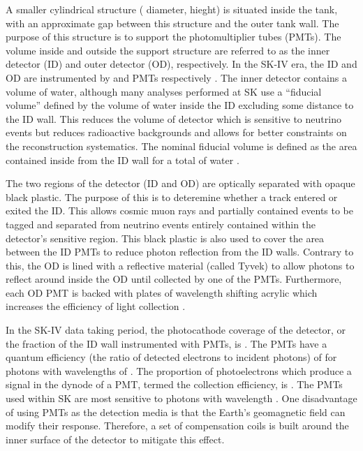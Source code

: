 A smaller cylindrical structure ( diameter,  hieght) is situated inside the tank, with an approximate  gap between this structure and the outer tank wall. The purpose of this structure is to support the photomultiplier tubes (PMTs). The volume inside and outside the support structure are referred to as the inner detector (ID) and outer detector (OD), respectively. In the SK-IV era, the ID and OD are instrumented by   and   PMTs respectively \cite{Abe_2014_SKCalib}. The inner detector contains a  volume of water, although many analyses performed at SK use a ``fiducial volume'' defined by the volume of water inside the ID excluding some distance to the ID wall. This reduces the volume of detector which is sensitive to neutrino events but reduces radioactive backgrounds and allows for better constraints on the reconstruction systematics. The nominal fiducial volume is defined as the area contained inside  from the ID wall for a total of  water \cite{Jiang2019-iw}.

The two regions of the detector (ID and OD) are optically separated with opaque black plastic. The purpose of this is to deteremine whether a track entered or exited the ID. This allows cosmic muon rays and partially contained events to be tagged and separated from neutrino events entirely contained within the detector's sensitive region. This black plastic is also used to cover the area between the ID PMTs to reduce photon reflection from the ID walls. Contrary to this, the OD is lined with a reflective material (called Tyvek) to allow photons to reflect around inside the OD until collected by one of the PMTs. Furthermore, each OD PMT is backed with  plates of wavelength shifting acrylic which increases the efficiency of light collection \cite{Fukuda2003-ly}.

In the SK-IV data taking period, the photocathode coverage of the detector, or the fraction of the ID wall instrumented with PMTs, is  \cite{Fukuda2003-ly}. The PMTs have a quantum efficiency (the ratio of detected electrons to incident photons) of  for photons with wavelengths of . The proportion of photoelectrons which produce a signal in the dynode of a PMT, termed the collection efficiency, is  \cite{Fukuda2003-ly}. The PMTs used within SK are most sensitive to photons with wavelength  \cite{Fukuda2003-ly}. One disadvantage of using PMTs as the detection media is that the Earth's geomagnetic field can modify their response. Therefore, a set of compensation coils is built around the inner surface of the detector to mitigate this effect.

